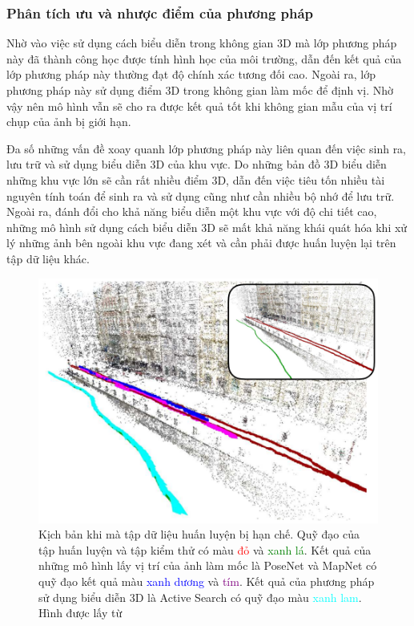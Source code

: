 \subsubsection*{Phân tích ưu và nhược điểm của phương pháp}
Nhờ vào việc sử dụng cách biểu diễn trong không gian 3D mà lớp phương pháp này đã thành công học được tính hình học của môi trường, dẫn đến kết quả của lớp phương pháp này thường đạt độ chính xác tương đối cao. Ngoài ra, lớp phương pháp này sử dụng điểm 3D trong không gian làm mốc để định vị. Nhờ vậy nên mô hình vẫn sẽ cho ra được kết quả tốt khi không gian mẫu của vị trí chụp của ảnh bị giới hạn.

Đa số những vấn đề xoay quanh lớp phương pháp này liên quan đến việc sinh ra, lưu trữ và sử dụng biểu diễn 3D của khu vực. Do những bản đồ 3D biểu diễn những khu vực lớn sẽ cần rất nhiều điểm 3D, dẫn đến việc tiêu tốn nhiều tài nguyên tính toán để sinh ra và sử dụng cũng như cần nhiều bộ nhớ để lưu trữ. Ngoài ra, đánh đổi cho khả năng biểu diễn một khu vực với độ chi tiết cao, những mô hình sử dụng cách biểu diễn 3D sẽ mất khả năng khái quát hóa khi xử lý những ảnh bên ngoài khu vực đang xét và cần phải được huấn luyện lại trên tập dữ liệu khác.

\begin{figure}[H]
    \centering
    \includegraphics[scale=0.7]{pics/Chapter2/lim.png}
    \caption[Kịch bản so sánh phương pháp 3D và phương pháp sử dụng biểu diễn ngầm \cite{sattler2019understanding}]{Kịch bản khi mà tập dữ liệu huấn luyện bị hạn chế. Quỹ đạo của tập huấn luyện và tập kiểm thử có màu \textcolor{red}{đỏ} và \textcolor{green}{xanh lá}. Kết quả của những mô hình lấy vị trí của ảnh làm mốc là PoseNet \cite{kendall2016posenet} và MapNet \cite{brahmbhatt2018geometryaware} có quỹ đạo kết quả màu \textcolor{blue}{xanh dương} và \textcolor{purple}{tím}. Kết quả của phương pháp sử dụng biểu diễn 3D là Active Search \cite{sattler2016efficient} có quỹ đạo màu \textcolor{cyan}{xanh lam}. Hình được lấy từ \cite{sattler2019understanding}}
\end{figure}


